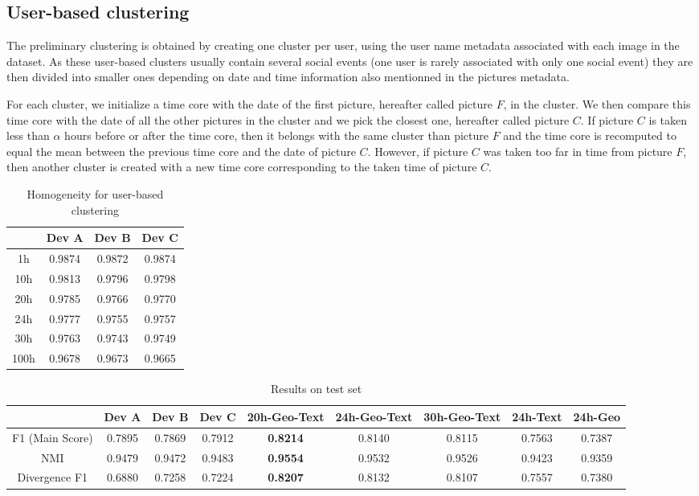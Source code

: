 \documentclass{acm_proc_article-me11_tweaked}
\begin{document}
\subsection{User-based clustering}\label{preliminary}
The preliminary clustering is obtained by creating one cluster per user, using the user name metadata associated with each image in the dataset.
As these user-based clusters usually contain several social events (one user is rarely associated with only one social event) they are then divided into smaller ones depending on date and time information also mentionned in the pictures metadata.

For each cluster, we initialize a time core with the date of the first picture, hereafter called picture $F$, in the cluster. We then compare this time core with the date of all the other pictures in the cluster and we pick the closest one, hereafter called picture $C$. If picture $C$ is taken less than $\alpha$ hours before or after the time core, then it belongs with the same cluster than picture $F$ and the time core is recomputed to equal the mean between the previous time core and the date of picture $C$. However, if picture $C$ was taken too far in time from picture $F$, then another cluster is created with a new time core corresponding to the taken time of picture $C$. 

\begin{table}[t]
\centering
\caption{Homogeneity for user-based clustering}\label{t:preliminary}
\begin{tabular}{|c|c|c|c|} \hline
 & \textbf{Dev A} & \textbf{Dev B} & \textbf{Dev C}\\\hline
1h &  0.9874 & 0.9872 & 0.9874\\\hline
10h &  0.9813  & 0.9796 & 0.9798\\\hline
20h &  0.9785  & 0.9766 & 0.9770\\\hline
24h &  0.9777  & 0.9755 & 0.9757\\\hline
30h & 0.9763   & 0.9743 & 0.9749\\\hline
100h & 0.9678 & 0.9673 & 0.9665\\\hline
\end{tabular}
\end{table}

\begin{table*}[t]
\centering
\caption{Results on test set}\label{t:test}
\begin{tabular}{|c||c|c|c||c|c|c|c|c|} \hline
 & Dev A & Dev B & Dev C & 20h-Geo-Text & 24h-Geo-Text & 30h-Geo-Text & 24h-Text & 24h-Geo\\\hline
F1 (Main Score) &0.7895 &0.7869 & 0.7912& \textbf{0.8214} & 0.8140 & 0.8115 & 0.7563 & 0.7387\\\hline
NMI & 0.9479&0.9472 & 0.9483& \textbf{0.9554} & 0.9532 & 0.9526 & 0.9423 & 0.9359\\\hline
Divergence F1 & 0.6880 &0.7258 & 0.7224& \textbf{0.8207} & 0.8132 & 0.8107 & 0.7557 & 0.7380\\\hline
\end{tabular}
\end{table*}
\end{document}

